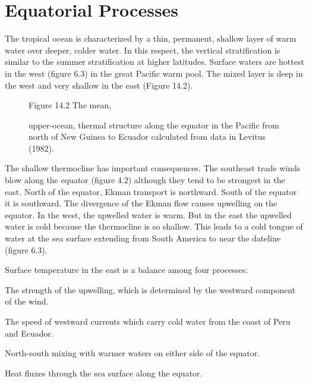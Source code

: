 \section{Equatorial Processes}
The tropical ocean is characterized by a
thin, permanent, shallow layer of warm water over deeper, colder
water. In this respect, the vertical stratification is similar to the
summer stratification at higher latitudes. Surface waters are hottest
in the west (figure 6.3) in the great Pacific warm pool. The mixed
layer is deep in the west and very
shallow in the east (Figure 14.2).

\begin{figure}[t!]
\centering
{}
\footnotesize
Figure 14.2 The mean, \rule{0pt}{3ex}upper-ocean, thermal structure
along the equator in the Pacific from north of New Guinea to Ecuador
calculated from data in Levitus (1982).

\label{fig:equator}
\vspace{-2ex}
\end{figure}

The shallow thermocline has important
consequences. The southeast trade winds blow along the equator (figure
4.2) although they tend to be strongest in the east. North of the
equator, Ekman transport is northward. South of the
equator it is southward. The divergence of the Ekman flow causes
upwelling on the equator. In the west, the
upwelled water is warm. But in the east the upwelled water is cold
because the thermocline is so shallow.  This leads to a cold tongue of
water at the sea surface extending from South America to near the
dateline (figure 6.3).

Surface temperature in the east is a balance
among four processes:
\begin{enumerate}
\vitem The strength of the upwelling,
which is determined by the westward component of the wind.

\vitem The speed of westward currents which carry cold water from the
coast of Peru and Ecuador.

\vitem North-south mixing with warmer waters
on either side of the equator.

\vitem Heat fluxes through the sea surface along the equator.
\end{enumerate}

